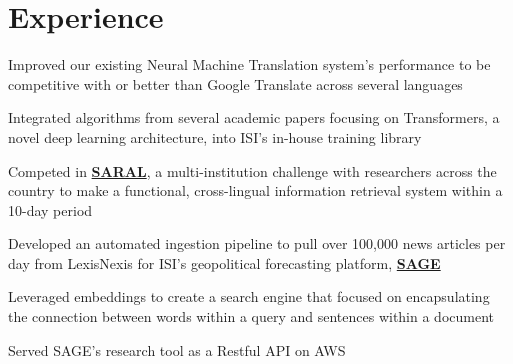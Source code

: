 \documentclass[letterpaper]{deedy-resume} %
\begin{document}
\hfill
%
%
\begin{minipage}[t]{0.66\textwidth} %


\section{Experience}

\vspace{\topsep} %
\vspace{\topsep}

\begin{tightitemize}
\item Improved our existing Neural Machine Translation system’s performance to be competitive with or better than Google Translate across several languages 
\item Integrated algorithms from several academic papers focusing on Transformers, a novel deep learning architecture, into ISI’s in-house training library 
\item Competed in \href{https://viterbischool.usc.edu/news/2018/01/usc-isi-develop-translation-information-retrieval-system-uncommon-languages/}{\bf SARAL}, a multi-institution challenge with researchers across the country to make a functional, cross-lingual information retrieval system within a 10-day period

\item Developed an automated ingestion pipeline to pull over 100,000 news articles per day from LexisNexis for ISI’s geopolitical forecasting platform, \href{https://sage-platform.isi.edu}{\bf SAGE}
\item Leveraged embeddings to create a search engine that focused on encapsulating the connection between words within a query and sentences within a document 
\item Served SAGE’s research tool as a Restful API on AWS  
\end{tightitemize}




\end{minipage}
\end{document}
